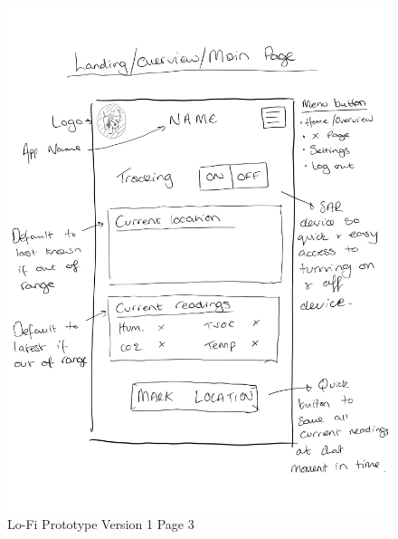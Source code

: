 \documentclass{ueacmpstyle}
\begin{document}
            \begin{figure}[h]
                
                \includegraphics[width=\linewidth]{Images/Lofi_v1_c.jpg}
                \caption{Lo-Fi Prototype Version 1 Page 3}
                \label{Figure Lofi v1 3}
                
            \end{figure}
            \clearpage
\end{document}
